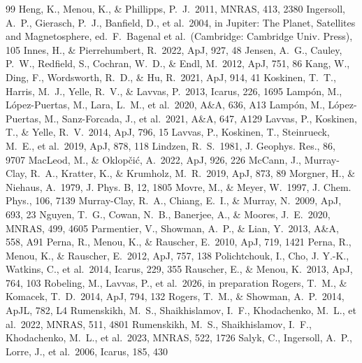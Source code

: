 \documentclass[english,a4paper]{my_memo}
\begin{document}
\begin{thebibliography}{99}
 Heng, K., Menou, K., \& Phillipps, P.~J.\ 2011, MNRAS, 413, 2380
 Ingersoll, A.~P., Gierasch, P.~J., Banfield, D., et al.\ 2004, in Jupiter: The Planet, Satellites and Magnetosphere, ed.\ F.~Bagenal et al.\ (Cambridge: Cambridge Univ. Press), 105
 Innes, H., \& Pierrehumbert, R.\ 2022, ApJ, 927, 48
 Jensen, A.~G., Cauley, P.~W., Redfield, S., Cochran, W.~D., \& Endl, M.\ 2012, ApJ, 751, 86
 Kang, W., Ding, F., Wordsworth, R.~D., \& Hu, R.\ 2021, ApJ, 914, 41
 Koskinen, T.~T., Harris, M.~J., Yelle, R.~V., \& Lavvas, P.\ 2013, Icarus, 226, 1695
 Lamp\'on, M., L\'opez-Puertas, M., Lara, L.~M., et al.\ 2020, A\&A, 636, A13
 Lamp\'on, M., L\'opez-Puertas, M., Sanz-Forcada, J., et al.\ 2021, A\&A, 647, A129
 Lavvas, P., Koskinen, T., \& Yelle, R.~V.\ 2014, ApJ, 796, 15
 Lavvas, P., Koskinen, T., Steinrueck, M.~E., et al.\ 2019, ApJ, 878, 118
 Lindzen, R.~S.\ 1981, J. Geophys. Res., 86, 9707
 MacLeod, M., \& Oklop\v{c}i\'c, A.\ 2022, ApJ, 926, 226
 McCann, J., Murray-Clay, R.~A., Kratter, K., \& Krumholz, M.~R.\ 2019, ApJ, 873, 89
 Morgner, H., \& Niehaus, A.\ 1979, J. Phys. B, 12, 1805
 Movre, M., \& Meyer, W.\ 1997, J. Chem. Phys., 106, 7139
 Murray-Clay, R.~A., Chiang, E.~I., \& Murray, N.\ 2009, ApJ, 693, 23
 Nguyen, T.~G., Cowan, N.~B., Banerjee, A., \& Moores, J.~E.\ 2020, MNRAS, 499, 4605
 Parmentier, V., Showman, A.~P., \& Lian, Y.\ 2013, A\&A, 558, A91
 Perna, R., Menou, K., \& Rauscher, E.\ 2010, ApJ, 719, 1421
 Perna, R., Menou, K., \& Rauscher, E.\ 2012, ApJ, 757, 138
 Polichtchouk, I., Cho, J. Y.-K., Watkins, C., et al.\ 2014, Icarus, 229, 355
 Rauscher, E., \& Menou, K.\ 2013, ApJ, 764, 103
 Robeling, M., Lavvas, P., et al.\ 2026, in preparation
 Rogers, T.~M., \& Komacek, T.~D.\ 2014, ApJ, 794, 132
 Rogers, T.~M., \& Showman, A.~P.\ 2014, ApJL, 782, L4
 Rumenskikh, M.~S., Shaikhislamov, I.~F., Khodachenko, M.~L., et al.\ 2022, MNRAS, 511, 4801
 Rumenskikh, M.~S., Shaikhislamov, I.~F., Khodachenko, M.~L., et al.\ 2023, MNRAS, 522, 1726
 Salyk, C., Ingersoll, A.~P., Lorre, J., et al.\ 2006, Icarus, 185, 430

\end{thebibliography}
\end{document}
